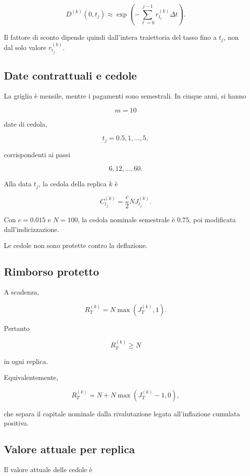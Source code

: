 \[
D^{(k)}(0,t_j)
\approx
\exp\left(
-
\sum_{\ell=0}^{j-1}
r_{t_\ell}^{(k)}\Delta t
\right).
\]

Il fattore di sconto dipende quindi dall'intera traiettoria del tasso fino a
\(t_j\), non dal solo valore \(r_{t_j}^{(k)}\).

\subsection{Date contrattuali e cedole}

La griglia \`e mensile, mentre i pagamenti sono semestrali. In cinque anni, si
hanno

\[
m=10
\]

\noindent date di cedola,

\[
t_j=0.5,1,\ldots,5,
\]

\noindent corrispondenti ai passi

\[
6,12,\ldots,60.
\]

Alla data \(t_j\), la cedola della replica \(k\) \`e

\[
C_{t_j}^{(k)}
=
\frac{c}{2}
N
J_{t_j}^{(k)}.
\]

Con \(c=0.015\) e \(N=100\), la cedola nominale semestrale \`e \(0.75\), poi
modificata dall'indicizzazione.

Le cedole non sono protette contro la deflazione.

\subsection{Rimborso protetto}

A scadenza,

\[
R_T^{(k)}
=
N\max
\left(
J_T^{(k)},1
\right).
\]

Pertanto

\[
R_T^{(k)}
\geq N
\]

\noindent in ogni replica.

Equivalentemente,

\[
R_T^{(k)}
=
N
+
N\max
\left(
J_T^{(k)}-1,0
\right),
\]

\noindent che separa il capitale nominale dalla rivalutazione legata all'inflazione
cumulata positiva.

\subsection{Valore attuale per replica}

Il valore attuale delle cedole \`e

